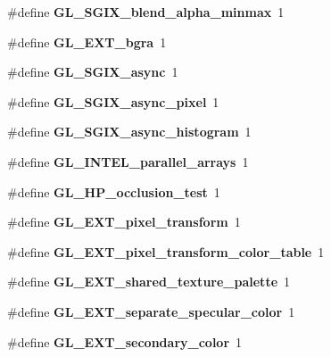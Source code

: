 \begin{DoxyCompactItemize}
\item 
\#define {\bfseries G\+L\+\_\+\+S\+G\+I\+X\+\_\+blend\+\_\+alpha\+\_\+minmax}~1\label{_s_d_l__opengl_8h_a6db2277cb1ed2327477df68bdd958bc6}

\item 
\#define {\bfseries G\+L\+\_\+\+E\+X\+T\+\_\+bgra}~1\label{_s_d_l__opengl_8h_aee41999b057c9eab5bf7d0d31588270d}

\item 
\#define {\bfseries G\+L\+\_\+\+S\+G\+I\+X\+\_\+async}~1\label{_s_d_l__opengl_8h_a521f14c7e1809b5f8079d730102da0a3}

\item 
\#define {\bfseries G\+L\+\_\+\+S\+G\+I\+X\+\_\+async\+\_\+pixel}~1\label{_s_d_l__opengl_8h_a5ef1dc9d7ede2e27ffa18c6f9f523664}

\item 
\#define {\bfseries G\+L\+\_\+\+S\+G\+I\+X\+\_\+async\+\_\+histogram}~1\label{_s_d_l__opengl_8h_a3d1b344d29f67dbfe063fe5ddbd8094a}

\item 
\#define {\bfseries G\+L\+\_\+\+I\+N\+T\+E\+L\+\_\+parallel\+\_\+arrays}~1\label{_s_d_l__opengl_8h_a5548296ff6ada6a4c1d1b9440670401e}

\item 
\#define {\bfseries G\+L\+\_\+\+H\+P\+\_\+occlusion\+\_\+test}~1\label{_s_d_l__opengl_8h_a2935e70c3a4d6b3021b8fa7e916b98c8}

\item 
\#define {\bfseries G\+L\+\_\+\+E\+X\+T\+\_\+pixel\+\_\+transform}~1\label{_s_d_l__opengl_8h_a5bcff34dc0cd476cc470dc2db6fce74e}

\item 
\#define {\bfseries G\+L\+\_\+\+E\+X\+T\+\_\+pixel\+\_\+transform\+\_\+color\+\_\+table}~1\label{_s_d_l__opengl_8h_a195d46f259509ca95db1c820cafb798a}

\item 
\#define {\bfseries G\+L\+\_\+\+E\+X\+T\+\_\+shared\+\_\+texture\+\_\+palette}~1\label{_s_d_l__opengl_8h_aed74a7fa1af791e6842a75c5c2ed31ae}

\item 
\#define {\bfseries G\+L\+\_\+\+E\+X\+T\+\_\+separate\+\_\+specular\+\_\+color}~1\label{_s_d_l__opengl_8h_af1416eaaf89c3be86f19286a098ea52a}

\item 
\#define {\bfseries G\+L\+\_\+\+E\+X\+T\+\_\+secondary\+\_\+color}~1\label{_s_d_l__opengl_8h_a959e378b69a7528e9cdf7649231b54d6}


\end{DoxyCompactItemize}
